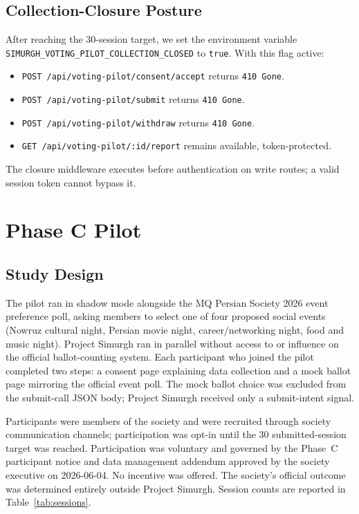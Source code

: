 \documentclass[conference]{IEEEtran}
\newcommand{\sys}{Project Simurgh}
\begin{document}
\subsection{Collection-Closure Posture}

After reaching the 30-session target, we set the environment variable
\texttt{SIMURGH\_VOTING\_PILOT\_COLLECTION\_CLOSED} to \texttt{true}.
With this flag active:
\begin{itemize}
  \item \texttt{POST /api/voting-pilot/consent/accept} returns \texttt{410 Gone}.
  \item \texttt{POST /api/voting-pilot/submit} returns \texttt{410 Gone}.
  \item \texttt{POST /api/voting-pilot/withdraw} returns \texttt{410 Gone}.
  \item \texttt{GET /api/voting-pilot/:id/report} remains available,
    token-protected.
\end{itemize}
The closure middleware executes before authentication on write routes; a valid
session token cannot bypass it.

\section{Phase C Pilot}

\subsection{Study Design}

The pilot ran in shadow mode alongside the MQ Persian Society 2026 event
preference poll, asking members to select one of four proposed social events
(Nowruz cultural night, Persian movie night, career/networking night, food and
music night). \sys{} ran in parallel without access to or influence on the
official ballot-counting system. Each participant who joined the pilot completed
two steps: a consent page explaining data collection and a mock ballot page
mirroring the official event poll. The mock ballot choice was excluded from the
submit-call JSON body; \sys{} received only a submit-intent signal.

Participants were members of the society and were recruited through society
communication channels; participation was opt-in until the 30
submitted-session target was reached. Participation was voluntary and
governed by the Phase~C participant notice and data management addendum approved
by the society executive on 2026-06-04. No incentive was offered.
The society's official outcome was determined entirely outside \sys{}.
Session counts are reported in Table~\ref{tab:sessions}.
\end{document}
